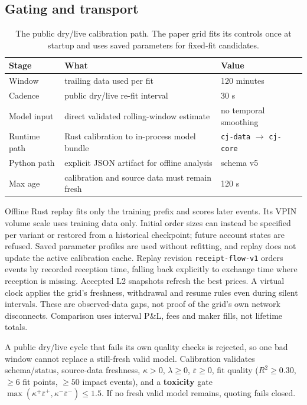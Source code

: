 \documentclass[11pt,a4paper]{article}
\newcommand{\epsb}{\bar{\varepsilon}}
\newcommand{\code}[1]{\texttt{\small #1}}
\begin{document}
\subsection{Gating and transport}

\begin{table}[htbp]
\centering\small
\begin{tabular}{@{}lll@{}}
\toprule
\textbf{Stage} & \textbf{What} & \textbf{Value} \\
\midrule
Window          & trailing data used per fit    & 120 minutes \\
Cadence         & public dry/live re-fit interval & 30 s \\
Model input     & direct validated rolling-window estimate & no temporal smoothing \\
Runtime path    & Rust calibration to in-process model bundle & \code{cj-data} $\to$ \code{cj-core} \\
Python path     & explicit JSON artifact for offline analysis & schema v5 \\
Max age         & calibration and source data must remain fresh & 120 s \\
\bottomrule
\end{tabular}
\caption{The public dry/live calibration path. The paper grid fits its controls
once at startup and uses saved parameters for fixed-fit candidates.}
\end{table}

Offline Rust replay fits only the training prefix and scores later events.
Its VPIN volume scale uses training data only. Initial order sizes can instead
be specified per variant or restored from a historical checkpoint; future
account states are refused. Saved parameter profiles are used without
refitting, and replay does not update the active calibration cache.
Replay revision \code{receipt-flow-v1} orders events by recorded reception time, falling back explicitly to
exchange time where reception is missing. Accepted L2 snapshots refresh the
best prices. A virtual clock applies the grid's freshness, withdrawal and
resume rules even during silent intervals. These are observed-data gaps, not
proof of the grid's own network disconnects. Comparison uses interval P\&L,
fees and maker fills, not lifetime totals.

A public dry/live cycle that fails its own quality checks is rejected, so one bad window cannot
replace a still-fresh valid model. Calibration validates schema/status,
source-data freshness, $\kappa>0$, $\lambda\ge0$, $\epsb\ge0$, fit quality
($R^2 \ge 0.30$, $\ge 6$ fit points, $\ge 50$ impact events), and a
\textbf{toxicity} gate $\max(\kappa^{+}\epsb^{+}, \kappa^{-}\epsb^{-}) \le 1.5$.
If no fresh valid model remains, quoting fails closed.
\end{document}
